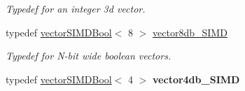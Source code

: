 \begin{DoxyCompactItemize}
\begin{DoxyCompactList}\small\item\em Typedef for an integer 3d vector. \end{DoxyCompactList}\item 
typedef \hyperlink{classirr_1_1core_1_1vectorSIMDBool}{vector\+S\+I\+M\+D\+Bool}$<$ 8 $>$ \hyperlink{namespaceirr_1_1core_ac06c4472b261a35fd20061cbbac7f1b5}{vector8db\+\_\+\+S\+I\+MD}\hypertarget{namespaceirr_1_1core_ac06c4472b261a35fd20061cbbac7f1b5}{}\label{namespaceirr_1_1core_ac06c4472b261a35fd20061cbbac7f1b5}

\begin{DoxyCompactList}\small\item\em Typedef for N-\/bit wide boolean vectors. \end{DoxyCompactList}\item 
typedef \hyperlink{classirr_1_1core_1_1vectorSIMDBool}{vector\+S\+I\+M\+D\+Bool}$<$ 4 $>$ {\bfseries vector4db\+\_\+\+S\+I\+MD}\hypertarget{namespaceirr_1_1core_a9e52cdcc811761c3aa19a5c1979f0124}{}\label{namespaceirr_1_1core_a9e52cdcc811761c3aa19a5c1979f0124}

\end{DoxyCompactItemize}

